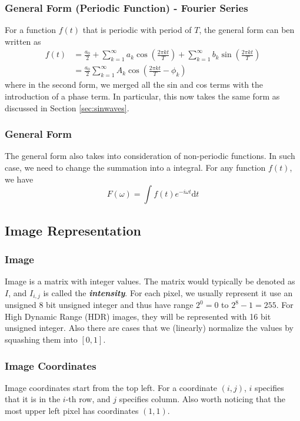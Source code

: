 \documentclass[11pt]{article}
\begin{document}
\subsubsection{General Form (Periodic Function) - Fourier Series}
For a function $f(t)$ that is periodic with period of $T$, the general form can ben written as 
\begin{align}
	f(t) 
	&= \frac{a_0}{2} + \sum_{k = 1}^\infty a_k \cos\left(\frac{2\pi k t}{T}\right) + \sum_{k = 1}^\infty b_k \sin\left(\frac{2\pi k t}{T}\right) \\
	&= \frac{a_0}{2} \sum_{k = 1}^\infty A_k \cos\left(\frac{2\pi kt}{T} - \phi_k\right)
\end{align}
where in the second form, we merged all the sin and cos terms with the introduction of a phase term. In particular, this now takes the same form as discussed in Section \ref{sec:sinwaves}. 

\subsubsection{General Form}
The general form also takes into consideration of non-periodic functions. In such case, we need to change the summation into a integral. For any function $f(t)$, we have
\begin{equation}
	F(\omega) = \int f(t) e^{-i\omega t} \mathrm d t
\end{equation}

\subsection{Image Representation}
\subsubsection{Image}
Image is a matrix with integer values. The matrix would typically be denoted as $I$, and $I_{i, j}$ is called the \textit{\textbf{intensity}}. For each pixel, we usually represent it use an unsigned 8 bit unsigned integer and thus have range $2^0 = 0$ to $2^8 - 1 = 255$. For High Dynamic Range (HDR) images, they will be represented with 16 bit unsigned integer. Also there are cases that we (linearly) normalize the values by squashing them into $[0, 1]$. 

\subsubsection{Image Coordinates}
Image coordinates start from the top left. For a coordinate $(i, j)$, $i$ specifies that it is in the $i$-th row, and $j$ specifies column. Also worth noticing that the most upper left pixel has coordinates $(1, 1)$. 
\end{document}
